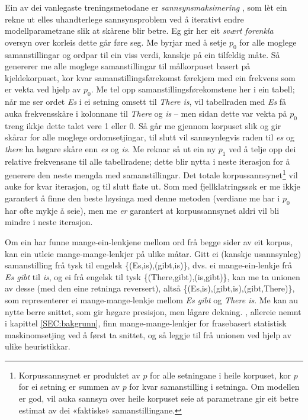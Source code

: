 \documentclass[11pt,a4paper,oneside,draft]{report}
\begin{document}
 Ein av dei vanlegaste treningsmetodane er \emph{sannsynsmaksimering}
 \citep[utførleg forklart i][]{prescher-em}, som lèt ein rekne ut
 elles uhandterlege sannsynsproblem ved å iterativt endre
 modellparametrane slik at skårene blir betre. Eg gir her eit \emph{svært  forenkla} oversyn over korleis dette går føre seg. Me byrjar med å
 setje $p_0$ for alle moglege samanstillingar og ordpar til ein viss
 verdi, kanskje på ein tilfeldig måte. Så genererer me alle moglege
 samanstillingar til målkorpuset basert på kjeldekorpuset, kor kvar
 samanstillingsførekomst førekjem med ein frekvens som er vekta ved
 hjelp av $p_0$. Me tel opp samanstillingsførekomstene her i ein
 tabell; når me ser ordet \emph{Es} i ei setning omsett til \emph{There is}, vil
 tabellraden med \emph{Es} få auka frekvensskåre i kolonnane til \emph{There} og
 \emph{is} -- men sidan dette var vekta på $p_0$ treng ikkje dette talet
 vere 1 eller 0. Så går me gjennom korpuset slik og gir skårar for
 alle moglege ordomsetjingar, til slutt vil sannsynlegvis raden til
 \emph{es} og \emph{there} ha høgare skåre enn \emph{es} og \emph{is}. Me reknar så ut ein
 ny $p_1$ ved å telje opp dei relative frekvensane til alle
 tabellradene; dette blir nytta i neste iterasjon for å generere den
 neste mengda med samanstillingar. Det totale korpussannsynet\footnote{Korpussannsynet er produktet av $p$ for alle setningane i
        heile korpuset, kor $p$ for ei setning er summen av $p$ for
        kvar samanstilling i setninga. Om modellen er god, vil auka
        sannsyn over heile korpuset seie at parametrane gir eit betre
        estimat av dei «faktiske» samanstillingane. }
 vil auke for kvar iterasjon, og til slutt flate ut. Som med
 fjellklatringssøk er me ikkje garantert å finne den beste løysinga
 med denne metoden (verdiane me har i $p_0$ har ofte mykje å seie),
 men me \emph{er} garantert at korpussannsynet aldri vil bli mindre i neste
 iterasjon.

 Om ein har funne mange-ein-lenkjene mellom ord frå begge sider av eit
 korpus, kan ein utleie mange-mange-lenkjer på ulike måtar. Gitt ei
 (kanskje usannsynleg) samanstilling frå tysk til engelsk
 \{(Es,is),(gibt,is)\}, dvs. ei mange-ein-lenkje frå \emph{Es gibt} til
 \emph{is}, og ei frå engelsk til tysk \{(There,gibt),(is,gibt)\}, kan me
 ta unionen av desse (med den eine retninga reversert), altså
 \{(Es,is),(gibt,is),(gibt,There)\}, som representerer ei
 mange-mange-lenkje mellom \emph{Es gibt} og \emph{There is}. Me kan au nytte
 berre snittet, som gir høgare presisjon, men lågare dekning.
 \citet{koehn2003spb}, allereie nemnt i kapittel \ref{SEC:bakgrunn},
 finn mange-mange-lenkjer for frasebasert statistisk maskinomsetjing
 ved å først ta snittet, og så leggje til frå unionen ved hjelp av
 ulike heuristikkar.
\end{document}
